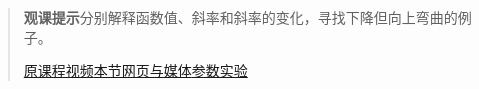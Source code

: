 \begin{quote}\small\textbf{观课提示}\quad 分别解释函数值、斜率和斜率的变化，寻找下降但向上弯曲的例子。

\href{https://www.youtube.com/watch?v=BLkz5LGWihw}{原课程视频}\quad\href{https://vitael04213.github.io/3blue1brown-notes/lessons/higher-order-derivatives.html}{本节网页与媒体}\quad\href{https://vitael04213.github.io/3blue1brown-notes/lab.html\#taylor}{参数实验}
\end{quote}
